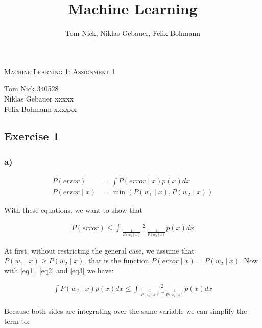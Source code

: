 \documentclass[10pt,a4paper]{article}
\author{Tom Nick, Niklas Gebauer, Felix Bohmann}
\title{Machine Learning}
\begin{document}
\begin{center}
\Large{\textsc{Machine Learning 1: Assignment 1}} \\
\end{center}

\begin{tabbing}
Tom Nick \hspace{0.9cm}\= 340528\\
Niklas Gebauer\>  xxxxx \\
Felix Bohmann\> xxxxxx
\end{tabbing}

\subsection*{Exercise 1}
\subsubsection*{a)}
\begin{align}
	P(error) &= \int P(error\mid x)p(x) dx \label{eq1} \\
	P(error\mid x) &= \min (P(w_1\mid x), P(w_2\mid x)) \label{eq2}
\end{align}

With these equations, we want to show that

\begin{align}
	P(error) \le \int \frac{2}{\frac{1}{P(w_1\mid x)} + \frac{1}{P(w_2 \mid x)}} p(x) dx \label{eq3}
\end{align}

At first, without restricting the general case, we assume that $P(w_1 \mid x) \ge P(w_2 \mid x) \label{ass1}$, that is the function $P(error \mid x) = P(w_2 \mid x)$. Now with \eqref{eq1}, \eqref{eq2} and \eqref{eq3} we have:

\begin{align*}
	\int P(w_2 \mid x)p(x) dx \le \int \frac{2}{\frac{1}{P(w_1\mid x)} + \frac{1}{P(w_2 \mid x)}} p(x) dx
\end{align*}

Because both sides are integrating over the same variable we can simplify the term to:
\end{document}
